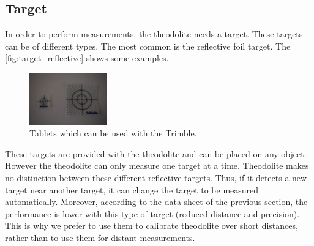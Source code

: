 \documentclass[10pt,letterpaper,oneside]{article}
\begin{document}

\subsection{Target}

In order to perform measurements, the theodolite needs a target.
These targets can be of different types.
The most common is the reflective foil target.
The \autoref{fig:target_reflective} shows some examples.


\begin{figure}[htb]
	\centering
	\includegraphics[width=0.3\textwidth]{./figs/Target.JPG}
	\caption{Tablets which can be used with the Trimble.}
	\label{fig:target_reflective}
\end{figure}

These targets are provided with the theodolite and can be placed on any object.
However the theodolite can only measure one target at a time.
Theodolite makes no distinction between these different reflective targets.
Thus, if it detects a new target near another target, it can change the target to be measured automatically.
Moreover, according to the data sheet of the previous section, the performance is lower with this type of target (reduced distance and precision).
This is why we prefer to use them to calibrate theodolite over short distances, rather than to use them for distant measurements.
\end{document}
